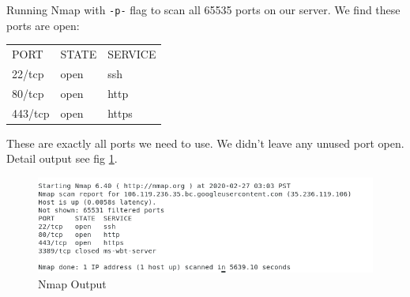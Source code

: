\documentclass[12pt, a4paper]{article}
\newcommand{\code}[1]{\texttt{#1}}
\begin{document}
Running Nmap with \code{-p-} flag to scan all 65535 ports on our server.
We find these ports are open:
\begin{center}
    \begin{tabular}{l l l}
        PORT & STATE & SERVICE \\
        22/tcp & open & ssh\\
        80/tcp & open & http\\
        443/tcp & open & https
    \end{tabular}
\end{center}

These are exactly all ports we need to use. We didn't leave any unused port open. Detail output see fig \ref{fig:nmap}.

\begin{figure}[H]
\centering
\includegraphics[width=\textwidth, frame]{nmap_log.png}
\caption{Nmap Output}
\label{fig:nmap}
\end{figure}
\end{document}
